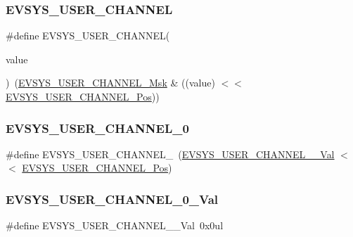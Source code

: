 \subsubsection{\texorpdfstring{EVSYS\_USER\_CHANNEL}{EVSYS\_USER\_CHANNEL}}
{\footnotesize\ttfamily \#define E\+V\+S\+Y\+S\+\_\+\+U\+S\+E\+R\+\_\+\+C\+H\+A\+N\+N\+EL(\begin{DoxyParamCaption}\item[{}]{value }\end{DoxyParamCaption})~(\mbox{\hyperlink{group___s_a_m_d21___e_v_s_y_s_ga255273a4399694d342bbccdda41108b8}{E\+V\+S\+Y\+S\+\_\+\+U\+S\+E\+R\+\_\+\+C\+H\+A\+N\+N\+E\+L\+\_\+\+Msk}} \& ((value) $<$$<$ \mbox{\hyperlink{group___s_a_m_d21___e_v_s_y_s_ga4ce28148cd49044148eed72085814831}{E\+V\+S\+Y\+S\+\_\+\+U\+S\+E\+R\+\_\+\+C\+H\+A\+N\+N\+E\+L\+\_\+\+Pos}}))}

\mbox{\label{group___s_a_m_d21___e_v_s_y_s_gac2728c6680cac80b7a8a51f7e367990d}} 
\subsubsection{\texorpdfstring{EVSYS\_USER\_CHANNEL\_0}{EVSYS\_USER\_CHANNEL\_0}}
{\footnotesize\ttfamily \#define E\+V\+S\+Y\+S\+\_\+\+U\+S\+E\+R\+\_\+\+C\+H\+A\+N\+N\+E\+L\+\_~(\mbox{\hyperlink{group___s_a_m_d21___e_v_s_y_s_ga30a3f03f14abc1097e0a8ef96c3fe706}{E\+V\+S\+Y\+S\+\_\+\+U\+S\+E\+R\+\_\+\+C\+H\+A\+N\+N\+E\+L\+\_\+\_\+\+Val}}      $<$$<$ \mbox{\hyperlink{group___s_a_m_d21___e_v_s_y_s_ga4ce28148cd49044148eed72085814831}{E\+V\+S\+Y\+S\+\_\+\+U\+S\+E\+R\+\_\+\+C\+H\+A\+N\+N\+E\+L\+\_\+\+Pos}})}

\mbox{\label{group___s_a_m_d21___e_v_s_y_s_ga30a3f03f14abc1097e0a8ef96c3fe706}} 
\subsubsection{\texorpdfstring{EVSYS\_USER\_CHANNEL\_0\_Val}{EVSYS\_USER\_CHANNEL\_0\_Val}}
{\footnotesize\ttfamily \#define E\+V\+S\+Y\+S\+\_\+\+U\+S\+E\+R\+\_\+\+C\+H\+A\+N\+N\+E\+L\+\_\+\_\+\+Val~0x0ul}



